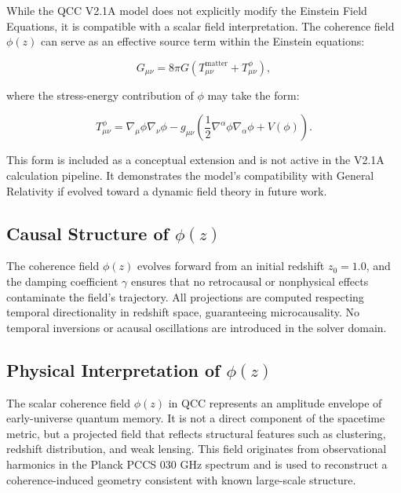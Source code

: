 \documentclass[12pt]{article}
\begin{document}
While the QCC V2.1A model does not explicitly modify the Einstein Field Equations, it is compatible with a scalar field interpretation. The coherence field \(\phi(z)\) can serve as an effective source term within the Einstein equations:

\begin{equation}
	G_{\mu\nu} = 8\pi G \left( T_{\mu\nu}^{\text{matter}} + T_{\mu\nu}^{\phi} \right),
\end{equation}

where the stress-energy contribution of \(\phi\) may take the form:

\begin{equation}
	T_{\mu\nu}^{\phi} = \nabla_\mu \phi \nabla_\nu \phi - g_{\mu\nu} \left( \frac{1}{2} \nabla^\alpha \phi \nabla_\alpha \phi + V(\phi) \right).
\end{equation}

This form is included as a conceptual extension and is not active in the V2.1A calculation pipeline. It demonstrates the model’s compatibility with General Relativity if evolved toward a dynamic field theory in future work.

\subsection*{Causal Structure of \(\phi(z)\)}

The coherence field \(\phi(z)\) evolves forward from an initial redshift \(z_0 = 1.0\), and the damping coefficient \(\gamma\) ensures that no retrocausal or nonphysical effects contaminate the field’s trajectory. All projections are computed respecting temporal directionality in redshift space, guaranteeing microcausality. No temporal inversions or acausal oscillations are introduced in the solver domain.

\subsection*{Physical Interpretation of \(\phi(z)\)}

The scalar coherence field \(\phi(z)\) in QCC represents an amplitude envelope of early-universe quantum memory. It is not a direct component of the spacetime metric, but a projected field that reflects structural features such as clustering, redshift distribution, and weak lensing. This field originates from observational harmonics in the Planck PCCS 030 GHz spectrum and is used to reconstruct a coherence-induced geometry consistent with known large-scale structure.
\end{document}
